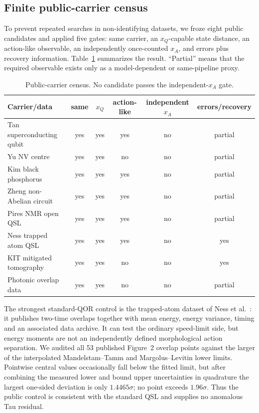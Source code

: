 \subsection{Finite public-carrier census}

To prevent repeated searches in non-identifying datasets, we froze eight
public candidates and applied five gates: same carrier, an $x_Q$-capable state
distance, an action-like observable, an independently once-counted $x_A$, and
errors plus recovery information.  Table~\ref{tab:public-census} summarizes
the result.  ``Partial'' means that the required observable exists only as a
model-dependent or same-pipeline proxy.

\begin{table}[ht]
\centering
\small
\caption{Public-carrier census. No candidate passes the independent-$x_A$ gate.}
\label{tab:public-census}
\begin{tabularx}{\textwidth}{@{}Xccccc@{}}
\toprule
Carrier/data & same & $x_Q$ & action-like & independent $x_A$ & errors/recovery\\
\midrule
Tan superconducting qubit & yes & yes & yes & no & partial\\
Yu NV centre & yes & yes & no & no & partial\\
Kim black phosphorus & yes & yes & yes & no & partial\\
Zheng non-Abelian circuit & yes & yes & yes & no & partial\\
Pires NMR open QSL & yes & yes & yes & no & partial\\
Ness trapped atom QSL & yes & yes & yes & no & yes\\
KIT mitigated tomography & yes & yes & no & no & yes\\
Photonic overlap data & yes & yes & no & no & partial\\
\bottomrule
\end{tabularx}
\end{table}

The strongest standard-QOR control is the trapped-atom dataset of Ness et
al.\ \citep{Ness2021QSL}: it publishes two-time overlaps together with mean
energy, energy variance, timing and an associated data archive.  It can test
the ordinary speed-limit side, but energy moments are not an independently
defined morphological action separation.  We audited all 53 published
Figure~2 overlap points against the larger of the interpolated
Mandelstam--Tamm and Margolus--Levitin lower limits.  Pointwise central values
occasionally fall below the fitted limit, but after combining the measured
lower and bound upper uncertainties in quadrature the largest one-sided
deviation is only $1.4465\sigma$; no point exceeds $1.96\sigma$.  Thus the
public control is consistent with the standard QSL and supplies no anomalous
Tau residual.

